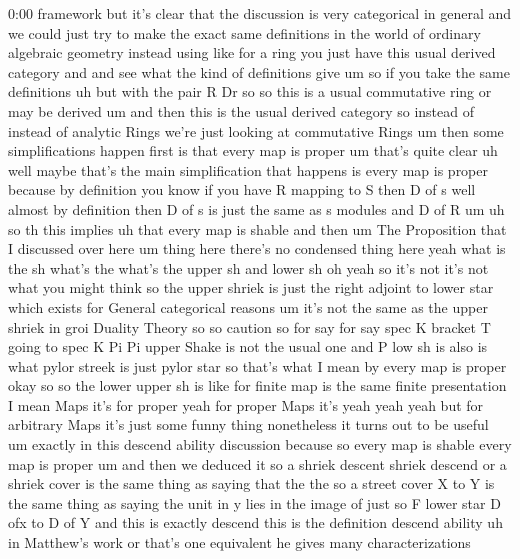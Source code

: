 \begin{unfinished}{0:00}
framework  but  it's  clear  that  the
discussion  is  very  categorical  in
general  and  we  could  just  try  to  make
the  exact  same  definitions  in  the  world
of  ordinary  algebraic  geometry  instead
using  like  for  a  ring  you  just  have  this
usual  derived  category  and  and  see  what
the  kind  of  definitions
give  um  so  if  you  take  the  same
definitions  uh  but
with  the  pair  R
Dr  so  so  this  is  a
usual  commutative  ring  or  may  be  derived
um  and  then  this  is  the  usual  derived
category  so  instead  of  instead  of
analytic  Rings  we're  just  looking  at
commutative  Rings  um
then  some  simplifications  happen  first
is  that  every  map  is
proper  um  that's  quite  clear  uh  well
maybe  that's  the  main  simplification
that  happens  is  every  map  is  proper
because
by  definition  you  know  if  you  have  R
mapping  to  S  then  D  of  s  well  almost  by
definition  then  D  of  s  is  just  the  same
as  s  modules  and  D  of
R
um  uh  so  th  this  implies  uh  that  every
map  is
shable  and  then  um  The  Proposition  that
I  discussed  over  here
um
thing  here  there's  no  condensed  thing
here  yeah  what  is  the
sh  what's
the  what's  the  upper  sh  and  lower  sh  oh
yeah  so  it's  not  it's  not  what  you  might
think  so  the  upper  shriek  is  just  the
right  adjoint  to  lower  star  which  exists
for  General  categorical
reasons  um  it's  not  the  same  as  the
upper  shriek  in  groi  Duality  Theory  so
so
caution  so  for  say
for  say  spec  K  bracket  T  going  to  spec
K  Pi  Pi  upper  Shake  is
not  the  usual  one  and  P  low  sh  is  also
is  what  pylor  streek  is  just  pylor  star
so  that's  what  I  mean  by  every  map  is
proper  okay  so  so  the  lower  upper  sh  is
like  for  finite  map  is  the
same  finite
presentation  I
mean  Maps
it's  for  proper  yeah  for  proper  Maps
it's  yeah  yeah
yeah  but  for  arbitrary  Maps  it's  just
some  funny  thing  nonetheless  it  turns
out  to  be  useful  um  exactly  in  this
descend  ability  discussion  because  so
every  map  is  shable  every  map  is  proper
um  and  then  we  deduced  it  so  a  shriek
descent  shriek  descend  or  a  shriek  cover
is  the  same  thing  as  saying  that  the  the
so  a  street  cover  X  to  Y  is  the  same
thing  as  saying  the  unit  in  y  lies  in
the  image  of  just  so  F  lower
star  D  ofx  to  D  of
Y  and  this  is
exactly
descend  this  is  the
definition  descend  ability  uh  in
Matthew's  work  or  that's  one  equivalent
he  gives  many  characterizations

\end{unfinished}
